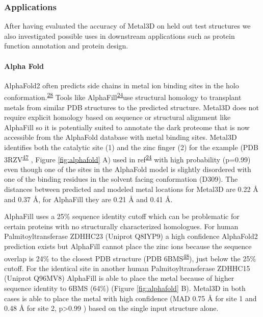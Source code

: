 \documentclass[  ASAPversion,
  ,
  9pt]{elife}
\begin{document}
\hypertarget{applications}{%
\subsubsection{Applications}\label{applications}}

After having evaluated the accuracy of Metal3D on held out test structures we also investigated possible uses in downstream applications such as protein function annotation and protein design.

\hypertarget{alpha-fold}{%
\paragraph{Alpha Fold}\label{alpha-fold}}

AlphaFold2 often predicts side chains in metal ion binding sites in the holo conformation.\textsuperscript{\protect\hyperlink{ref-yZfcMIwh}{28}} Tools like AlphaFill\textsuperscript{\protect\hyperlink{ref-13fLqNwbD}{24}}use structural homology to transplant metals from similar PDB structures to the predicted structure. Metal3D does not require explicit homology based on sequence or structural alignment like AlphaFill so it is potentially suited to annotate the dark proteome that is now accessible from the AlphaFold database with metal binding sites. Metal3D identifies both the catalytic site (1) and the zinc finger (2) for the example (PDB 3RZV\textsuperscript{\protect\hyperlink{ref-wW700ShK}{47}} , Figure \ref{fig:alphafold} A) used in ref\textsuperscript{\protect\hyperlink{ref-13fLqNwbD}{24}} with high probability (p=0.99) even though one of the sites in the AlphaFold model is slightly disordered with one of the binding residues in the solvent facing conformation (D309). The distances between predicted and modeled metal locations for Metal3D are 0.22 Å and 0.37 Å, for AlphaFill they are 0.21 Å and 0.41 Å.

AlphaFill uses a 25\% sequence identity cutoff which can be problematic for certain proteins with no structurally characterized homologues. For human Palmitoyltransferase ZDHHC23 (Uniprot Q8IYP9) a high confidence AlphaFold2 prediction exists but AlphaFill cannot place the zinc ions because the sequence overlap is 24\% to the closest PDB structure (PDB 6BMS\textsuperscript{\protect\hyperlink{ref-RFwEiPTW}{48}}), just below the 25\% cutoff. For the identical site in another human Palmitoyltransferase ZDHHC15 (Uniprot Q96MV8) AlphaFill is able to place the metal because of higher sequence identity to 6BMS (64\%) (Figure \ref{fig:alphafold} B). Metal3D in both cases is able to place the metal with high confidence (MAD 0.75 Å for site 1 and 0.48 Å for site 2, p\textgreater0.99 ) based on the single input structure alone.
\end{document}
